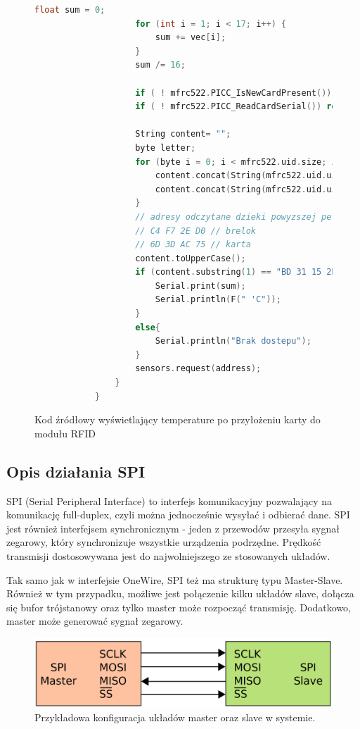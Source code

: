 \documentclass[polish,a4paper]{article}
\begin{document}
\begin{figure}[h!]
\begin{lstlisting}[language=C++, basicstyle=\tiny]
					float sum = 0;
					for (int i = 1; i < 17; i++) {
						sum += vec[i];
					}
					sum /= 16;
					
					if ( ! mfrc522.PICC_IsNewCardPresent()) return;
					if ( ! mfrc522.PICC_ReadCardSerial()) return;
					
					String content= "";
					byte letter;
					for (byte i = 0; i < mfrc522.uid.size; i++){
						content.concat(String(mfrc522.uid.uidByte[i] < 0x10 ? " 0" : " "));
						content.concat(String(mfrc522.uid.uidByte[i], HEX));
					}
					// adresy odczytane dzieki powyzszej petli:
					// C4 F7 2E D0 // brelok
					// 6D 3D AC 75 // karta
					content.toUpperCase();
					if (content.substring(1) == "BD 31 15 2B"){
						Serial.print(sum);
						Serial.println(F(" 'C"));
					}
					else{
						Serial.println("Brak dostepu");
					}
					sensors.request(address);
				}
			}
		\end{lstlisting}
		\caption*{Kod źródłowy wyświetlający temperature po przyłożeniu karty do modułu RFID}
	\end{figure}
	\newpage
	\subsection{Opis działania SPI}
	SPI (Serial Peripheral Interface) to interfejs komunikacyjny pozwalający na komunikację full-duplex, czyli można jednocześnie wysyłać i odbierać dane. SPI jest również interfejsem synchronicznym - jeden z przewodów przesyła sygnał zegarowy, który synchronizuje wszystkie urządzenia podrzędne. Prędkość transmisji dostosowywana jest do najwolniejszego ze stosowanych układów. 
	
	Tak samo jak w interfejsie OneWire, SPI też ma strukturę typu Master-Slave. Również w tym przypadku, możliwe jest połączenie kilku układów slave, dołącza się bufor trójstanowy oraz tylko master może rozpocząć transmisję. Dodatkowo, master może generować sygnał zegarowy.
	
	\begin{figure}[h!]
		\begin{center}
			\includegraphics[scale=0.2]{SPI.png}
			\caption*{Przykładowa konfiguracja układów master oraz slave w systemie.}
		\end{center}
	\end{figure}
	
\end{document}
